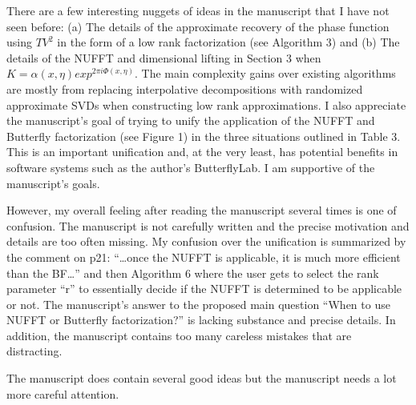\documentclass[11pt]{article}
\begin{document}

\vspace{0.5in}

 There are a few interesting nuggets of ideas in the manuscript that I have not seen before: (a) The details of the approximate recovery of the phase function using $TV^2$ in the form of a low rank factorization (see Algorithm 3) and (b) The details of the NUFFT and dimensional lifting in Section 3 when $K = \alpha(x,\eta)exp^{2\pi i\Phi(x,\eta)}$. The main complexity gains over existing algorithms are mostly from replacing interpolative decompositions with randomized approximate SVDs when constructing low rank approximations. I also appreciate the manuscript’s goal of trying to unify the application of the NUFFT and Butterfly factorization (see Figure 1) in the three situations outlined in Table 3. This is an important unification and, at the very least, has potential benefits in software systems such as the author's ButterflyLab. I am supportive of the manuscript’s goals. 

However, my overall feeling after reading the manuscript several times is one of confusion. The manuscript is not carefully written and the precise motivation and details are too often missing. My confusion over the unification is summarized by the comment on p21: “…once the NUFFT is applicable, it is much more efficient than the BF…” and then Algorithm 6 where the user gets to select the rank parameter “r” to essentially decide if the NUFFT is determined to be applicable or not. The manuscript’s answer to the proposed main question “When to use NUFFT or Butterfly factorization?” is lacking substance and precise details. In addition, the manuscript contains too many careless mistakes that are distracting. 

The manuscript does contain several good ideas but the manuscript needs a lot more careful attention.  
\end{document}
